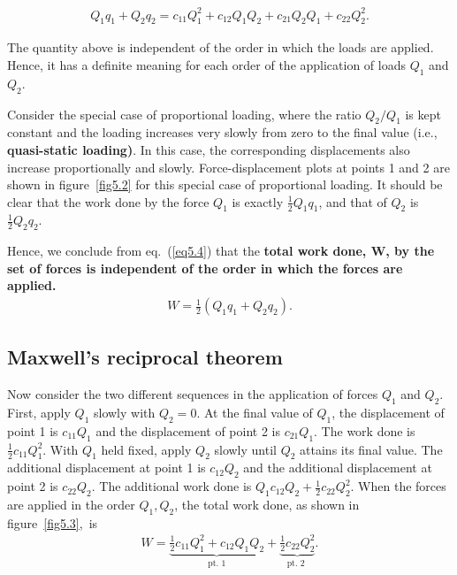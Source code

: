 \documentclass{AeroStructure-ERJohnson}
\begin{document}
\vspace*{-2.3pc}

\begin{align}\label{eq5.4}
Q_{1} q_{1}+Q_{2} q_{2}=c_{11} Q_{1}^{2}+c_{12} Q_{1} Q_{2}+c_{21} Q_{2} Q_{1}+c_{22} Q_{2}^{2} .
\end{align}

\vspace*{-1pc}

\noindent The quantity above is independent of the order in which the loads are applied. Hence, it has a definite meaning for each order of the application of loads $Q_1$ and $Q_2$.

Consider the special case of proportional loading, where the ratio $Q_2/Q_1$ is kept constant and the loading increases very slowly from zero to the final value (i.e., \textbf{quasi-static loading)}. In this case, the corresponding displacements also increase proportionally and slowly. Force-displacement plots at points 1 and 2 are shown in figure~\ref{fig5.2}\vadjust{\vspace*{10pt}\clearpage} for this special case of proportional loading. It should be clear that the work done by the force $Q_{1}$ is exactly $ \frac{1}{2} Q_{1} q_{1} $, and that of $Q_{2}$ is $\frac{1}{2} Q_{2} q_{2}$.



Hence, we conclude from eq.~(\ref{eq5.4}) that the \textbf{total work done, W, by the set of forces is independent of the order in which the forces are applied.}
\begin{align}\label{eq5.5}
W=\frac{1}{2}\left(Q_{1} q_{1}+Q_{2} q_{2}\right) .
\end{align}

\subsection{Maxwell's reciprocal theorem}\label{sec5.1.2}

Now consider the two different sequences in the application of forces $Q_1$ and $Q_2$. First, apply $Q_{1}$ slowly with $Q_{2}=0 $. At the final value of $Q_{1} $, the displacement of point 1 is $ c_{11} Q_{1} $ and the displacement of point 2 is $ c_{21} Q_{1} $. The work done is $ \frac{1}{2} c_{11} Q_{1}^{2} $. With $Q_{1}$ held fixed, apply $Q_{2}$ slowly until $Q_{2}$ attains its final value. The additional displacement at point 1 is $ c_{12} Q_{2} $ and the additional displacement at point 2 is $ c_{22} Q_{2} $. The additional work done is $ Q_{1} c_{12} Q_{2}+\frac{1}{2} c_{22} Q_{2}^{2} $. When the forces are applied in the order $ Q_{1}, Q_{2} $, the total work done, as shown in figure~\ref{fig5.3},~is
\begin{align*}
W=\underbrace{\frac{1}{2} c_{11} Q_{1}^{2}+c_{12} Q_{1} Q_{2}}_{\text {pt. } 1}+\underbrace{\frac{1}{2} c_{22} Q_{2}^{2}}_{\text {pt. 2 }}.
\end{align*}
\end{document}
